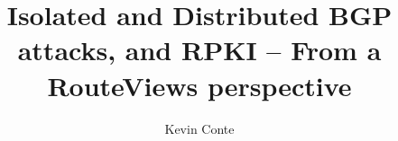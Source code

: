 \documentclass[sigconf]{acmart}
\begin{document}
\title{Isolated and Distributed BGP attacks, and RPKI -- From a RouteViews perspective}

\author{ Kevin Conte }


\begin{abstract}
    
\end{abstract}

\maketitle





\end{document}
